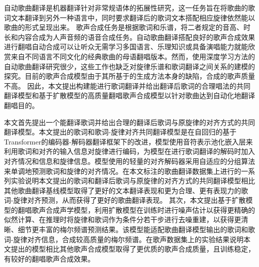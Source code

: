 \newcommand{\eg}{\textit{e}.\textit{g}.}
自动歌曲翻译是机器翻译针对非常规语体的拓展性研究，这一任务旨在将歌曲的歌词文本翻译到另外一种语言中，同时要求翻译后的歌词文本搭配相应旋律依然能以歌曲的形式呈现出来。
歌声合成任务是根据歌词和乐谱，将二者规定的音高、时长和内容合成为人声音频的语音合成任务。自动歌曲翻译搭配良好的歌声合成效果进行翻唱自动合成可以让听众无需学习多国语言、乐理知识或具备演唱能力就能欣赏来自不同语言不同文化的经典歌曲的母语翻唱版本。然而，使用深度学习方法的自动歌曲翻译研究很少，这些工作也缺乏对旋律乐谱和歌词翻译之间关系的建模的探究。目前的歌声合成模型由于其所基于的生成方法本身的缺陷，合成的歌声质量不高。
因此，本文提出构建能进行歌词翻译并给出翻译后歌词的合理唱法的共同翻译模型和基于扩散模型的高质量翻唱歌声合成模型以针对歌曲达到自动化地翻译翻唱目的。

本文首先提出一个能翻译歌词并给出合理的翻译后歌词与原旋律的对齐方式的共同翻译模型。本文提出的歌词和歌词-旋律对齐共同翻译模型是在自回归的基于Transformer的编码器-解码器翻译框架下的改进，模型使用音符表示池化嵌入层来利用歌词和对齐的输入信息对旋律进行编码，为模型在进行歌词翻译的解码时加入对齐情况和信息和旋律信息。模型使用的轻量的对齐解码器采用自适应的分组算法来单调地预测歌词和旋律的对齐情况。在本文标注的歌曲翻译数据集上进行的一系列实验说明本文提出的歌词和翻译后歌词与原旋律的对齐方式的共同翻译模型相比其他歌曲翻译基线模型取得了更好的文本翻译表现和更为合理、更有表现力的歌词-旋律对齐预测，从而获得了更好的歌曲翻译表现。
其次，本文提出基于扩散模型的翻唱歌声合成声学模型，利用扩散模型在训练时进行噪声估计以获得更精确的似然计算、在推理时将旋律和歌词作为条件分若干步进行去噪重建，以获得更清晰、细节更丰富的梅尔频谱预测结果。该模型能适配歌曲翻译模型输出的歌词和歌词-旋律对齐信息，合成较高质量的梅尔频谱。在歌声数据集上的实验结果说明本文提出的模型相比其他歌声合成模型取得了更优质的歌声合成质量，且训练稳定，有较好的翻唱歌声合成效果。

